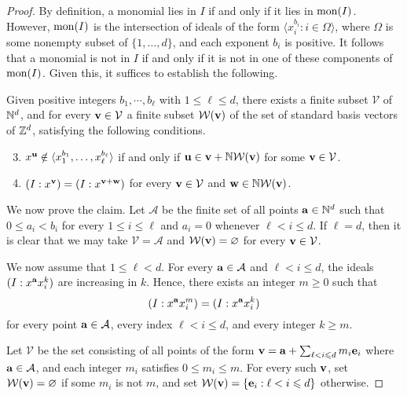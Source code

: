 \documentclass[11pt]{amsart}
\begin{document}
\begin{proof}  By definition, a monomial lies in $I$ if and only if it lies in $\operatorname{mon}(I)$.  However, $\operatorname{mon}(I)$ is the intersection of ideals of the form $\langle x_i^{b_i} : i \in \Omega \rangle$, where $\Omega$ is some nonempty subset of $\{ 1, \ldots, d \}$, and each exponent $b_i$ is positive.   It follows that a monomial is not in $I$ if and only if it is not in one of these components of $\operatorname{mon}(I)$.  Given this, it suffices to establish the following.


\begin{claim} Given positive integers  $b_1, \cdots, b_{\ell}$ with $1 \leq \ell \leq d$, there exists a finite subset $\mathcal{V}$ of $\mathbb{N}^d$, and for every $\mathbf{v} \in \mathcal{V}$ a finite subset $\mathcal{W}(\mathbf{v})$ of the set of standard basis vectors of $\mathbb{Z}^d$,  satisfying the following conditions.
\begin{enumerate}
\setcounter{enumi}{2}
\item \label{stab-1: e} $x^{\mathbf{u}} \notin \langle x_1^{b_1}, \ldots, x_{\ell}^{b_{\ell}} \rangle $ if and only if $\mathbf{u} \in \mathbf{v} + \mathbb{N} \mathcal{W}(\mathbf{v})$ for some $\mathbf{v} \in \mathcal{V}$.
\item \label{stab-2: e} $(I:x^{\mathbf{v}}) = (I: x^{\mathbf{v}+\mathbf{w}})$ for every $\mathbf{v} \in \mathcal{V}$ and $\mathbf{w} \in  \mathbb{N}  \mathcal{W}(\mathbf{v})$.
\end{enumerate}
\end{claim}

We now prove the claim.  Let $\mathcal{A}$ be the finite set of all points $\mathbf{a} \in \mathbb{N}^d$ such that $0 \leq a_i < b_i$ for every $1 \leq i \leq \ell$ and $a_i = 0$ whenever $\ell < i \leq d$.  If $\ell = d$, then it is clear that we may take $\mathcal{V} = \mathcal{A}$ and $\mathcal{W}(\mathbf{v}) = \varnothing$ for every $\mathbf{v} \in \mathcal{V}$.

We now assume that $1 \leq \ell < d$.
For every $\mathbf{a} \in \mathcal{A}$ and $\ell < i \leq d$, the ideals $(I: x^{\mathbf{a}} x_i^k)$ are increasing in $k$.  Hence, there exists an integer $m \geq 0$ such that
\begin{equation}
\label{colon-simple: e}
(I: x^{\mathbf{a}}x_i^m) = (I: x^{\mathbf{a}}x_i^k)
\end{equation}
for every point $\mathbf{a} \in \mathcal{A}$, every index $\ell < i \leq d$, and every integer $k \geq m$.


Let $\mathcal{V}$ be the set consisting of all points of the form $\mathbf{v} = \mathbf{a} + \sum_{\ell <i \leqslant d} m_i \mathbf{e}_i$ where $\mathbf{a} \in \mathcal{A}$, and each integer $m_i$ satisfies $0 \leq m_i \leq m$.  For every such $\mathbf{v}$, set $\mathcal{W}(\mathbf{v}) = \varnothing$ if some $m_i$ is not $m$, and set $\mathcal{W}(\mathbf{v}) = \{ \mathbf{e}_i : \ell < i \leqslant d \}$ otherwise.


\end{proof}
\end{document}
